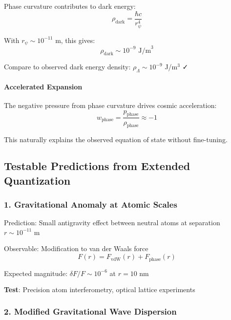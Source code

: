 \documentclass[12pt]{article}
\begin{document}
Phase curvature contributes to dark energy:
\begin{equation}
    \rho_{\text{dark}} = \frac{\hbar c}{r_\psi^4}
\end{equation}

With $r_\psi \sim 10^{-11}$ m, this gives:
\begin{equation}
    \rho_{\text{dark}} \sim 10^{-9} \text{ J/m}^3
\end{equation}

Compare to observed dark energy density: $\rho_{\Lambda} \sim 10^{-9}$ J/m$^3$ ✓

\paragraph{Accelerated Expansion}

The negative pressure from phase curvature drives cosmic acceleration:
\begin{equation}
    w_{\text{phase}} = \frac{p_{\text{phase}}}{\rho_{\text{phase}}} \approx -1
\end{equation}

This naturally explains the observed equation of state without fine-tuning.

\subsection{Testable Predictions from Extended Quantization}

\subsubsection{1. Gravitational Anomaly at Atomic Scales}

Prediction: Small antigravity effect between neutral atoms at separation $r \sim 10^{-11}$ m

Observable: Modification to van der Waals force
\begin{equation}
    F(r) = F_{\text{vdW}}(r) + F_{\text{phase}}(r)
\end{equation}

Expected magnitude: $\delta F/F \sim 10^{-6}$ at $r = 10$ nm

\textbf{Test}: Precision atom interferometry, optical lattice experiments

\subsubsection{2. Modified Gravitational Wave Dispersion}
\end{document}
